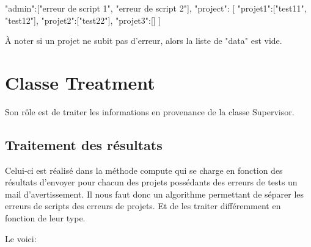 \begin{python}
{
	"admin":["erreur de script 1", "erreur de script 2"],
	"project":
	[
		"projet1":["test11", "test12"],
		"projet2":["test22"],
		"projet3":[]
	]
}
\end{python}
\`{A} noter si un projet ne subit pas d'erreur, alors la liste de "data" est vide.

\newpage

\section*{Classe Treatment}

Son rôle est de traiter les informations en provenance de la classe Supervisor.

\subsection*{Traitement des résultats}

Celui-ci est réalisé dans la méthode compute qui se charge en fonction des résultats d'envoyer pour chacun des projets possédants des erreurs de tests un mail d'avertissement. Il nous faut donc un algorithme permettant de séparer les erreurs de scripts des erreurs de projets. Et de les traiter différemment en fonction de leur type.

Le voici:


